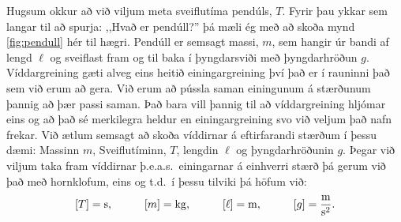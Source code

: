 \begin{minipage}{\linewidth}
Hugsum okkur að við viljum meta sveiflutíma pendúls, $T$. Fyrir þau ykkar sem langar til að spurja: ,,Hvað er pendúll?'' þá mæli ég með að skoða mynd \ref{fig:pendull} hér til hægri. Pendúll er semsagt massi, $m$, sem hangir úr bandi af lengd $\ell$ og sveiflast fram og til baka í þyngdarsviði með þyngdarhröðun $g$. Víddargreining gæti alveg eins heitið einingargreining því það er í rauninni það sem við erum að gera. Við erum að 
pússla saman einingunum á stærðunum þannig að þær passi saman. Það bara vill þannig til að víddargreining hljómar eins og að það sé merkilegra heldur en einingargreining svo við veljum það nafn frekar.
Við ætlum semsagt að skoða víddirnar á eftirfarandi stærðum í þessu dæmi: Massinn $m$, Sveiflutíminn, $T$, lengdin $\ell$ og þyngdarhröðunin $g$. Þegar við viljum taka fram víddirnar þ.e.a.s.~einingarnar á einhverri stærð þá gerum við það með hornklofum, eins og t.d.~í þessu tilviki þá höfum við:
\begin{align*}
    \left[ T \right] = \si{s}, \hspace{1cm} \left[ m \right] = \si{kg}, \hspace{1cm} \left[ \ell \right] = \si{m}, \hspace{1cm} \left[ g \right] = \si[per-mode=fraction]{\metre\per\second\squared}.
\end{align*}
\end{minipage}

